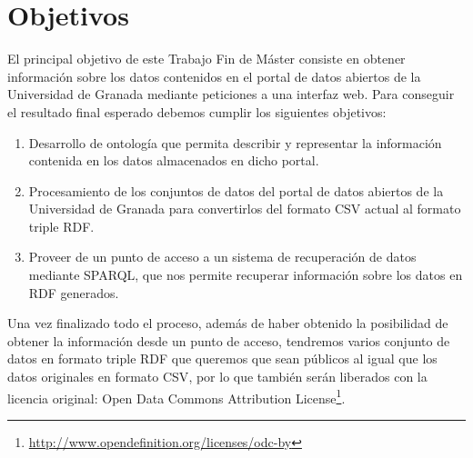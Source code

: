 \chapter{Objetivos}

El principal objetivo de este {\sf Trabajo Fin de Máster} consiste en obtener información sobre los datos contenidos en el portal de datos abiertos de la {\sf Universidad de Granada} mediante peticiones a una interfaz web. Para conseguir el resultado final esperado debemos cumplir los siguientes objetivos:

\begin{enumerate}
	\item Desarrollo de ontología que permita describir y representar la información contenida en los datos almacenados en dicho portal.
	\item Procesamiento de los conjuntos de datos del portal de datos abiertos de la {\sf Universidad de Granada} para convertirlos del formato {\sf CSV} actual al formato {\sf triple RDF}.
	\item Proveer de un punto de acceso a un sistema de recuperación de datos mediante {\sf SPARQL}, que nos permite recuperar información sobre los datos en {\sf RDF} generados.
\end{enumerate}

Una vez finalizado todo el proceso, además de haber obtenido la posibilidad de obtener la información desde un punto de acceso, tendremos varios conjunto de datos en formato {\sf triple RDF} que queremos que sean públicos al igual que los datos originales en formato {\sf CSV}, por lo que también serán liberados con la licencia original: {\sf Open Data Commons Attribution License}\footnote{\url{http://www.opendefinition.org/licenses/odc-by}}.